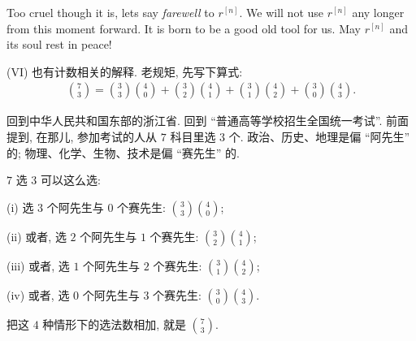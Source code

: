 \begin{remark}
    Too cruel though it is, let\apostrophe s say \textit{farewell} to $r^{[n]}$. We will not use $r^{[n]}$ any longer from this moment forward. It is born to be a good old tool for us. May $r^{[n]}$ and its soul rest in peace!
\end{remark}

\begin{example}
    (VI) 也有计数相关的解释. 老规矩, 先写下算式:
    \begin{align*}
        \binom{7}{3}
        = \binom{3}{3} \binom{4}{0}
        + \binom{3}{2} \binom{4}{1}
        + \binom{3}{1} \binom{4}{2}
        + \binom{3}{0} \binom{4}{3}.
    \end{align*}

    回到中华人民共和国东部的浙江省. 回到 ``普通高等学校招生全国统一考试''. 前面提到, 在那儿, 参加考试的人从 $7$ 科目里选 $3$ 个. 政治、历史、地理是偏 ``阿先生''  的; 物理、化学、生物、技术是偏 ``赛先生''  的.

    $7$ 选 $3$ 可以这么选:

    (i) 选 $3$ 个阿先生与 $0$ 个赛先生: $\binom{3}{3} \binom{4}{0}$;

    (ii) 或者, 选 $2$ 个阿先生与 $1$ 个赛先生: $\binom{3}{2} \binom{4}{1}$;

    (iii) 或者, 选 $1$ 个阿先生与 $2$ 个赛先生: $\binom{3}{1} \binom{4}{2}$;

    (iv) 或者, 选 $0$ 个阿先生与 $3$ 个赛先生: $\binom{3}{0} \binom{4}{3}$.

    把这 $4$ 种情形下的选法数相加, 就是 $\binom{7}{3}$.
\end{example}
